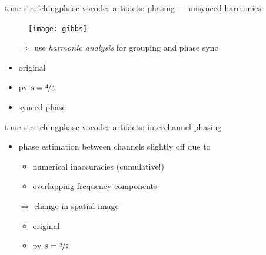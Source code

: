 	\begin{frame}{time stretching}{phase vocoder artifacts: phasing --- unsynced harmonics}
        \vspace{-3mm}
                        \begin{figure}
                            \centering
                                \texttt{[image: gibbs]}
                        \end{figure}
        \pause
                \begin{itemize}
                    \item[$\Rightarrow$] use \textit{harmonic analysis} for grouping and phase sync
                \end{itemize}
                        \begin{itemize}
                            \item   original  
                            \item   pv $s = \nicefrac{4}{3}$ 
                            \item   synced phase 
                        \end{itemize}
        \vspace{50mm}
    \end{frame}
	\begin{frame}{time stretching}{phase vocoder artifacts: interchannel phasing}
        \begin{itemize}
            \item   phase estimation between channels slightly off due to
                \begin{itemize}
                    \item   numerical inaccuracies (cumulative!)
                    \item   overlapping frequency components
                \end{itemize}
                \pause
                \bigskip
            \item[$\Rightarrow$] change in spatial image
                \begin{itemize}
                            \item   {}\; original  
                            \item   {}\; pv $s = \nicefrac{3}{2}$ 
                \end{itemize}
        \end{itemize}
	\end{frame}

